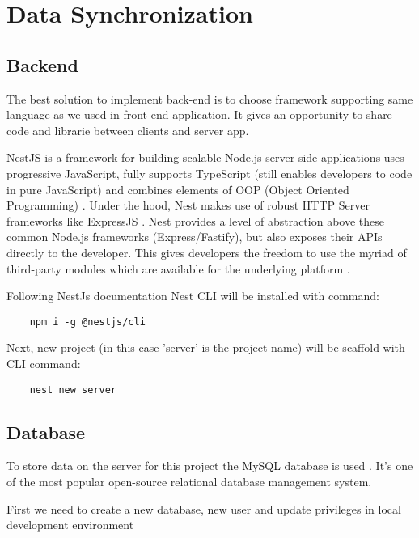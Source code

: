 \chapter{{Data Synchronization}}%
\label{ch:synchronisation}


\section{{Backend}}%
\label{sec:backend}
The best solution to implement back-end is to choose framework supporting same language as we used in front-end application. It gives an opportunity to share code and librarie between clients and server app.

\begin{displayquote}
    NestJS is a framework for building scalable Node.js server-side applications uses progressive JavaScript,  fully supports TypeScript (still enables developers to code in pure JavaScript) and combines elements of OOP (Object Oriented Programming) \autocite{NyakundiOOP}. Under the hood, Nest makes use of robust HTTP Server frameworks like ExpressJS \autocite{ExpressJS}. 
    Nest provides a level of abstraction above these common Node.js frameworks (Express/Fastify), but also exposes their APIs directly to the developer. This gives developers the freedom to use the myriad of third-party modules which are available for the underlying platform \autocite{NestJsDoc}.
\end{displayquote}

Following NestJs documentation Nest CLI will be installed with command:
\begin{verbatim}
    npm i -g @nestjs/cli
\end{verbatim}

Next, new project (in this case 'server' is the project name) will be scaffold with CLI command:
\begin{verbatim}
    nest new server
\end{verbatim}



\section{{Database}}%
\label{sec:database}

To store data on the server for this project the MySQL database is used \autocite{MySQL}. It's one of the most popular open-source relational database management system.

First we need to create a new database, new user and update privileges in local development environment

